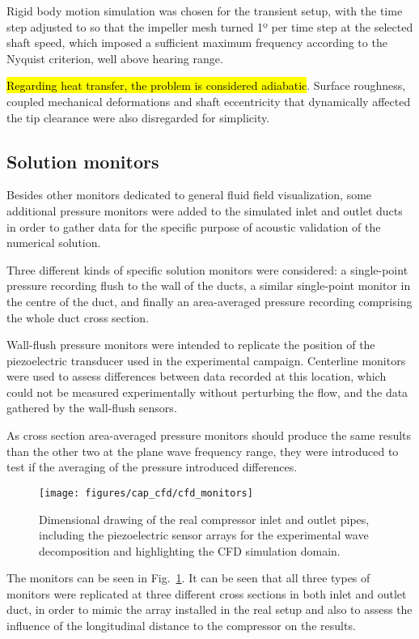 Rigid body motion simulation was chosen for the transient setup, with the time step adjusted to so that the impeller mesh turned 1º per time step at the selected shaft speed, which imposed a sufficient maximum frequency according to the Nyquist criterion, well above hearing range.

\hl{Regarding heat transfer, the problem is considered adiabatic}. Surface roughness, coupled mechanical deformations and shaft eccentricity that dynamically affected the tip clearance were also disregarded for simplicity.

\subsection{Solution monitors}\label{sub:cfd_sol_monitors}

Besides other monitors dedicated to general fluid field visualization, some additional pressure monitors were added to the simulated inlet and outlet ducts in order to gather data for the specific purpose of acoustic validation of the numerical solution.

Three different kinds of specific solution monitors were considered: a single-point pressure recording flush to the wall of the ducts, a similar single-point monitor in the centre of the duct, and finally an area-averaged pressure recording comprising the whole duct cross section. 

Wall-flush pressure monitors were intended to replicate the position of the piezoelectric transducer used in the experimental campaign. Centerline monitors were used to assess differences between data recorded at this location, which could not be measured experimentally without perturbing the flow, and the data gathered by the wall-flush sensors. 

As cross section area-averaged pressure monitors should produce the same results than the other two at the plane wave frequency range, they were introduced to test if the averaging of the pressure introduced differences.

\begin{figure}
\centering
\texttt{[image: figures/cap\_cfd/cfd\_monitors]}
\caption{Dimensional drawing of the real compressor inlet and outlet pipes, including the piezoelectric sensor arrays for the experimental wave decomposition and highlighting the CFD simulation domain.}
\label{fig:cfd_monitors}
\end{figure}

The monitors can be seen in Fig.~\ref{fig:cfd_monitors}. It can be seen that all three types of monitors were replicated at three different cross sections in both inlet and outlet duct, in order to mimic the array installed in the real setup and also to assess the influence of the longitudinal distance to the compressor on the results. 

